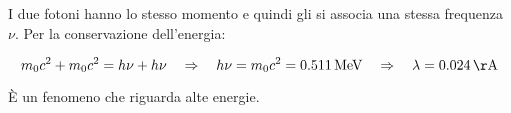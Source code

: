 I due fotoni hanno lo stesso momento e quindi gli si associa una stessa frequenza $\nu$.
Per la conservazione dell'energia:

\begin{equation}
m_0 c^2 + m_0 c^2 = h\nu + h\nu \quad \Rightarrow \quad 
h\nu = m_0 c^2 = \SI{0.511}{MeV} \quad \Rightarrow \quad
\lambda = \SI{0.024}{\AA}
\end{equation}

È un fenomeno che riguarda alte energie.




